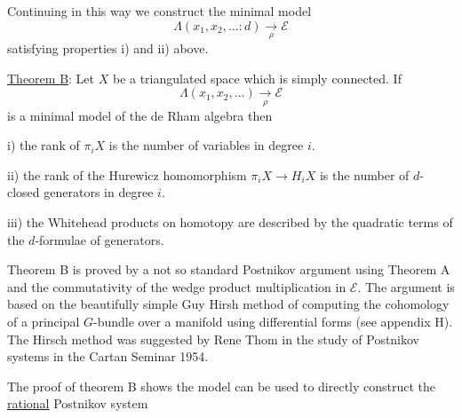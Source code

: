 Continuing in this way we construct the minimal model
\[
 \Lambda(x_1,x_2,\ldots\mathbin{:}d)\underset{\rho}{\to}\mathcal{E}
\]
satisfying properties i) and ii) above.

\uline{Theorem B}: Let $X$ be a triangulated space which is simply connected. If
\[
 \Lambda(x_1,x_2,\ldots)\underset{\rho}{\to}\mathcal{E}
\]
is a minimal model of the de Rham algebra then

i) the rank of $\pi_i X$ is the number of variables in degree $i$.

ii) the rank of the Hurewicz homomorphism $\pi_i X\to H_i X$ is the number of $d$-closed generators in degree $i$.

iii) the Whitehead products on homotopy are described by the quadratic terms of the $d$-formulae of generators.

Theorem B is proved by a not so standard Postnikov argument using Theorem A and the commutativity of the wedge product multiplication in $\mathcal{E}$. The argument is based on the beautifully simple Guy Hirsh method of computing the cohomology of a principal $G$-bundle over a manifold using differential forms (see appendix H). The Hirsch method was suggested by Rene Thom in the study of Postnikov systems in the Cartan Seminar 1954.

The proof of theorem B shows the model can be used to directly construct the \uline{rational} Postnikov system

